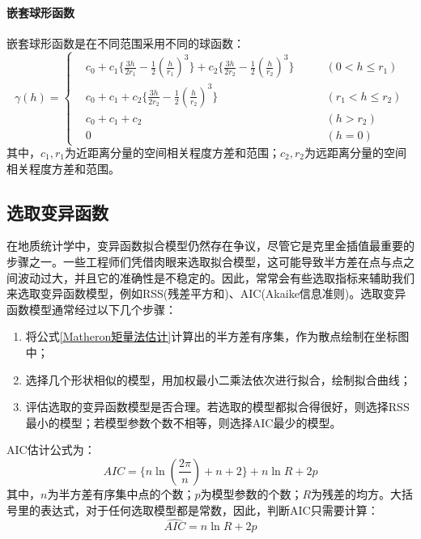 \paragraph{嵌套球形函数}
嵌套球形函数是在不同范围采用不同的球函数：
\begin{equation}
    \gamma \left( h \right) =
    \left\{
    \begin{aligned}
         & c_{0} + c_{1} \{ \frac{3h}{2r_{1}} - \frac{1}{2}\left( \frac{h}{r_{1}} \right)^{3} \} + c_{2} \{ \frac{3h}{2r_{2}} - \frac{1}{2}\left( \frac{h}{r_{2}} \right)^{3} \} \qquad & \left( 0 < h \leq r_{1} \right)     \\
         & c_{0} + c_{1} + c_{2} \{ \frac{3h}{2r_{2}} - \frac{1}{2}\left( \frac{h}{r_{2}} \right)^{3} \}                                                                                & \left( r_{1} < h \leq r_{2} \right) \\
         & c_{0} + c_{1} + c_{2}                                                                                                                                                        & \left( h > r_{2} \right)            \\
         & 0                                                                                                                                                                            & \left( h = 0 \right)
    \end{aligned}
    \right.
\end{equation}
其中，$ c_{1},r_{1} $为近距离分量的空间相关程度方差和范围；$ c_{2},r_{2} $为远距离分量的空间相关程度方差和范围。

\subsection{选取变异函数}
在地质统计学中，变异函数拟合模型仍然存在争议，尽管它是克里金插值最重要的步骤之一。一些工程师们凭借肉眼来选取拟合模型，这可能导致半方差在点与点之间波动过大，并且它的准确性是不稳定的。因此，常常会有些选取指标来辅助我们来选取变异函数模型，例如RSS(残差平方和)、AIC(Akaike信息准则)。选取变异函数模型通常经过以下几个步骤：
\begin{enumerate}
    \item 将公式\ref{Matheron矩量法估计}计算出的半方差有序集，作为散点绘制在坐标图中；
    \item 选择几个形状相似的模型，用加权最小二乘法依次进行拟合，绘制拟合曲线；
    \item 评估选取的变异函数模型是否合理。若选取的模型都拟合得很好，则选择RSS最小的模型；若模型参数个数不相等，则选择AIC最少的模型。
\end{enumerate}

AIC估计公式为：
\begin{equation}
    AIC = \{ n \ln \left( \frac{2 \pi}{n} \right) + n + 2 \} + n \ln R + 2 p
\end{equation}
其中，$ n $为半方差有序集中点的个数；$ p $为模型参数的个数；$ R $为残差的均方。大括号里的表达式，对于任何选取模型都是常数，因此，判断AIC只需要计算：
\begin{equation}
    \hat{AIC} = n \ln R + 2 p
\end{equation}
